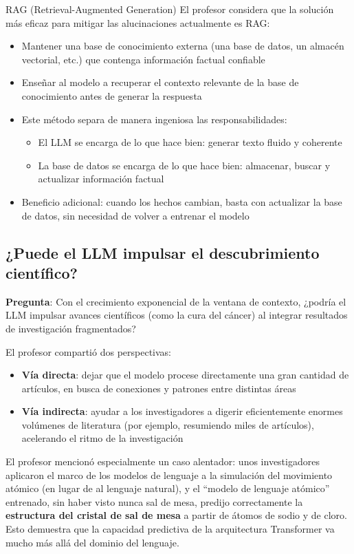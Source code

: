\begin{importantbox}{RAG (Retrieval-Augmented Generation)}
El profesor considera que la solución más eficaz para mitigar las alucinaciones actualmente es RAG:
\begin{itemize}
    \item Mantener una base de conocimiento externa (una base de datos, un almacén vectorial, etc.) que contenga información factual confiable
    \item Enseñar al modelo a recuperar el contexto relevante de la base de conocimiento antes de generar la respuesta
    \item Este método separa de manera ingeniosa las responsabilidades:
    \begin{itemize}
        \item El LLM se encarga de lo que hace bien: generar texto fluido y coherente
        \item La base de datos se encarga de lo que hace bien: almacenar, buscar y actualizar información factual
    \end{itemize}
    \item Beneficio adicional: cuando los hechos cambian, basta con actualizar la base de datos, sin necesidad de volver a entrenar el modelo
\end{itemize}
\end{importantbox}

\subsection{¿Puede el LLM impulsar el descubrimiento científico?}

\textbf{Pregunta}: Con el crecimiento exponencial de la ventana de contexto, ¿podría el LLM impulsar avances científicos (como la cura del cáncer) al integrar resultados de investigación fragmentados?

El profesor compartió dos perspectivas:
\begin{itemize}
    \item \textbf{Vía directa}: dejar que el modelo procese directamente una gran cantidad de artículos, en busca de conexiones y patrones entre distintas áreas
    \item \textbf{Vía indirecta}: ayudar a los investigadores a digerir eficientemente enormes volúmenes de literatura (por ejemplo, resumiendo miles de artículos), acelerando el ritmo de la investigación
\end{itemize}

El profesor mencionó especialmente un caso alentador: unos investigadores aplicaron el marco de los modelos de lenguaje a la simulación del movimiento atómico (en lugar de al lenguaje natural), y el ``modelo de lenguaje atómico'' entrenado, sin haber visto nunca sal de mesa, predijo correctamente la \textbf{estructura del cristal de sal de mesa} a partir de átomos de sodio y de cloro. Esto demuestra que la capacidad predictiva de la arquitectura Transformer va mucho más allá del dominio del lenguaje.

